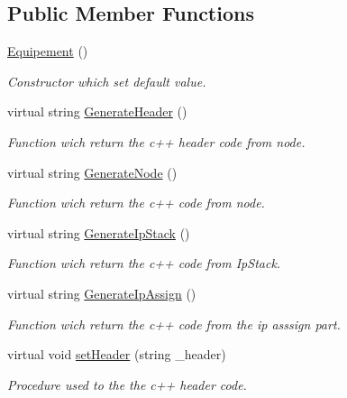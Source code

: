\subsection*{Public Member Functions}
\begin{CompactItemize}
\item 
\hyperlink{class_equipement_9057a4777d006cbac4c72d09a8d09407}{Equipement} ()
\begin{CompactList}\small\item\em Constructor which set default value. \item\end{CompactList}\item 
virtual string \hyperlink{class_equipement_8d24220539ff36aeb021daaec32f729e}{GenerateHeader} ()
\begin{CompactList}\small\item\em Function wich return the c++ header code from node. \item\end{CompactList}\item 
virtual string \hyperlink{class_equipement_e51f720e7db340b33d7392eb78c9cea2}{GenerateNode} ()
\begin{CompactList}\small\item\em Function wich return the c++ code from node. \item\end{CompactList}\item 
virtual string \hyperlink{class_equipement_37fe31be30e3ea66fe6bdaab9d66bc15}{GenerateIpStack} ()
\begin{CompactList}\small\item\em Function wich return the c++ code from IpStack. \item\end{CompactList}\item 
virtual string \hyperlink{class_equipement_d1e684114ebf6746f77cc370cdb449e5}{GenerateIpAssign} ()
\begin{CompactList}\small\item\em Function wich return the c++ code from the ip asssign part. \item\end{CompactList}\item 
virtual void \hyperlink{class_equipement_95b372e1d9f733f4c8fde9b3a1cf8321}{setHeader} (string \_\-header)
\begin{CompactList}\small\item\em Procedure used to the the c++ header code. \item\end{CompactList}\item 

\end{CompactItemize}

